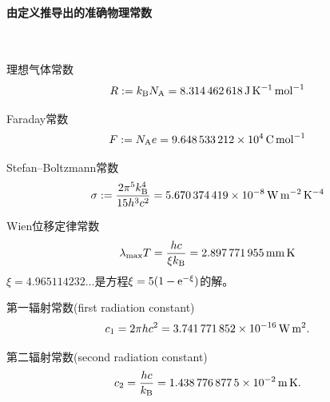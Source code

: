 \paragraph{由定义推导出的准确物理常数}~
\begin{compactitem}
	\item 理想气体常数
		\begin{align}
			R := k_{\mathrm{B}}N_{\mathrm{A}} = \qty{8.314462618}{\joule\per\kelvin\per\mole}
		\end{align} %
	\item Faraday常数
		\begin{align}
			F := N_{\mathrm{A}} e = \qty{9.648533212E4}{\coulomb\per\mole}
		\end{align} %
	\item Stefan--Boltzmann常数
		\begin{align}
			\sigma := \frac{2\pi^5\kB^4}{15h^3c^2} = \qty{5.670374419E-8}{\watt\per\metre\squared\per\kelvin\tothe{4}}
		\end{align} %
	\item Wien位移定律常数
		\begin{align}
			\lambda_{\max} T = \frac{hc}{\xi k_{\mathrm{B}}} = \qty{2.897771955}{\milli\metre\kelvin}
		\end{align} %
		$\xi = \num{4.965114232}\ldots$是方程$\xi = 5(1 - \mathop{}\!\mathrm{e}^{-\xi})$的解。
	\item 第一辐射常数(first radiation constant)
		\begin{equation}
			c_1 = 2\pi hc^2 = \qty{3.741771852E-16}{\watt\metre\squared}.
		\end{equation} %
	\item 第二辐射常数(second radiation constant)
		\begin{equation}
			c_2 = \frac{hc}{k_{\mathrm{B}}} = \qty{1.4387768775E-2}{\metre\kelvin}.
		\end{equation} %
\end{compactitem}
